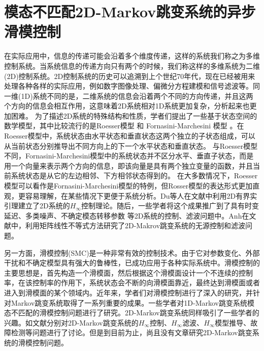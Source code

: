 
\chapter{模态不匹配2D-Markov跳变系统的异步滑模控制}
	在实际应用中，信息的传递可能会沿着多个维度传递，这样的系统我们称之为多维控制系统。当系统信息的传递方向只有两个的时候，我们称这样的多维系统为二维(2D)控制系统。2D控制系统的历史可以追溯到上个世纪70年代，现在已经被用来处理各种各样的实际应用，例如数字图像处理、偏微分方程建模和信号滤波\cite{roesser1975discrete,marszalek1984two,rogers2015multidimensional}等。同一维(1D)系统不同的是，二维系统的信息会沿着两个不同的方向传递，并且这两个方向的信息会相互作用，这意味着2D系统相对1D系统更加复杂，分析起来也更加困难。 为了描述2D系统的特殊结构和性质，学者们提出了一些基于状态空间的数学模型，其中比较流行的是Roesser模型 \cite{roesser1975discrete} 和 Fornasini-Marchesini 模型 \cite{fornasini1978doubly}。在Roesser模型中，系统状态由水平状态和垂直状态这两个独立的子状态组成，可以从当前状态分别推导出不同方向上的下一个水平状态和垂直状态。 与Roesser模型不同，Fornasini-Marchesini模型中的系统状态并不区分水平、垂直子状态，而是用一个向量来表示两个方向的信息，即该向量是具有两个独立变量的函数，并且当前系统状态是从它的左边相邻、下方相邻状态得到的。 在大多数情况下，Roesser模型可以看作是Fornasini-Marchesini模型的特例，但Rosser模型的表达形式更加直观，更容易理解，在某些情况下更便于系统分析。Du等人在文献\cite{du2001h,du2002hinfinity}中利用2D有界实引理建立了2D系统的$H_\infty$控制理论。随后，一些学者将这个成果推广到了具有时变延迟\cite{trinh2016stability}、多类噪声\cite{ahn2016stochastic}、不确定模态转移参数 \cite{chesi2016robust}等2D系统的控制、滤波问题中。Anh在文献\cite{ahn2015two}中，利用矩阵线性不等式方法研究了2D-Makrov跳变系统的无源控制和滤波问题。
	
	另一方面，滑模控制(SMC)是一种非常有效的控制技术。由于它对参数变化、外部干扰和不确定模型具有强大的鲁棒性，已成功应用于各种实际系统中\cite{utkin2009sliding,yang1999sliding,shima2006sliding}。滑模控制的主要思想是，首先构造一个滑模面，然后根据这个滑模面设计一个不连续的控制率，在该控制率的作用下，系统状态会不断的向滑模面靠近，最终达到滑模面或者进入到滑模面的某个领域内\cite{edwards1998sliding}。近年来，学者们对滑模控制进行了深入的研究，并针对Markov跳变系统取得了一系列重要的成果\cite{li2015state,wu2010state,wang2017smc}。一些学者对1D-Markov跳变系统模态不匹配的滑模控制问题进行了研究\cite{song2018asynchronous,li2017passivity,qi2018observer}。2D-Markov跳变系统同样吸引了一些学者的兴趣。如文献\cite{gao2004stabilization,wu2018hcontrol2d,wu2008hfiltering2d,wu2006modelreduction,shen2019dissipativity}分别对2D-Markov跳变系统的$H_\infty$控制、$H_\infty$滤波、$H_\infty$模型推导、故障检测等问题进行了讨论。但是到目前为止，尚且没有文章研究2D-Markov跳变系统的滑模控制问题。
	
